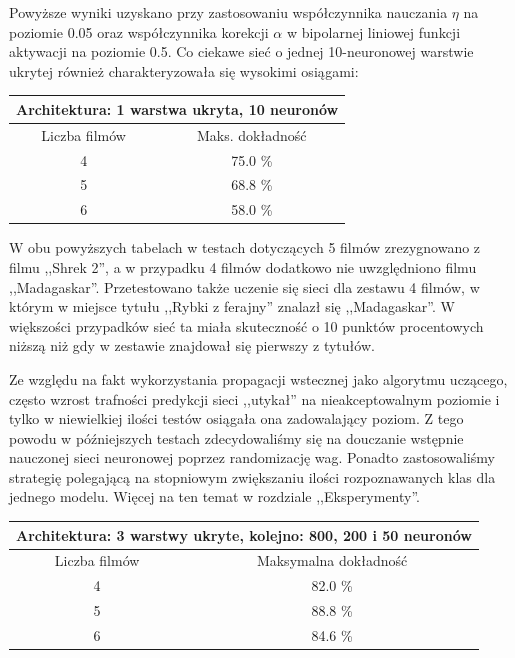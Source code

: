 \documentclass[12pt,a4paper]{article}
\begin{document}
\vspace{10pt}
Powyższe wyniki uzyskano przy zastosowaniu współczynnika nauczania $\eta$ na poziomie 0.05 oraz współczynnika korekcji $\alpha$ w bipolarnej liniowej funkcji aktywacji na poziomie 0.5. Co ciekawe sieć o jednej 10-neuronowej warstwie ukrytej również charakteryzowała się wysokimi osiągami: 

\begin{center}
\begin{tabular}{|| c | c ||} 
\hline
\multicolumn{2}{||c||}{Architektura: 1 warstwa ukryta, 10 neuronów} \\
 \hline
 Liczba filmów & Maks. dokładność \\
 \hline
 4 & 75.0 \% \\
 \hline
 5 & 68.8 \% \\ 
 \hline
 6 & 58.0 \% \\ 
 \hline
\end{tabular}
\end{center}

W obu powyższych tabelach w testach dotyczących 5 filmów zrezygnowano z filmu ,,Shrek 2'', a w przypadku 4 filmów dodatkowo nie uwzględniono filmu ,,Madagaskar''. Przetestowano także uczenie się sieci dla zestawu 4 filmów, w którym w miejsce tytułu ,,Rybki z ferajny'' znalazł się ,,Madagaskar''. W większości przypadków sieć ta miała skuteczność o 10 punktów procentowych niższą niż gdy w zestawie znajdował się pierwszy z tytułów.

\vspace{10pt}
Ze względu na fakt wykorzystania propagacji wstecznej jako algorytmu uczącego, często wzrost trafności predykcji sieci ,,utykał'' na nieakceptowalnym poziomie i tylko w niewielkiej ilości testów osiągała ona zadowalający poziom. Z tego powodu w późniejszych testach zdecydowaliśmy się na douczanie wstępnie nauczonej sieci neuronowej poprzez randomizację wag. Ponadto zastosowaliśmy strategię polegającą na stopniowym zwiększaniu ilości rozpoznawanych klas dla jednego modelu. Więcej na ten temat w rozdziale ,,Eksperymenty''.

\vspace{10pt}

\begin{center}
\begin{tabular}{|| c | c ||} 
\hline
\multicolumn{2}{||c||}{Architektura: 3 warstwy ukryte, kolejno: 800, 200 i 50 neuronów} \\
 \hline
 Liczba filmów & Maksymalna dokładność \\
 \hline
 4 & 82.0 \% \\
 \hline
 5 & 88.8 \% \\ 
 \hline
 6 & 84.6 \% \\ 
 \hline
\end{tabular}
\end{center}
	
\end{document}
